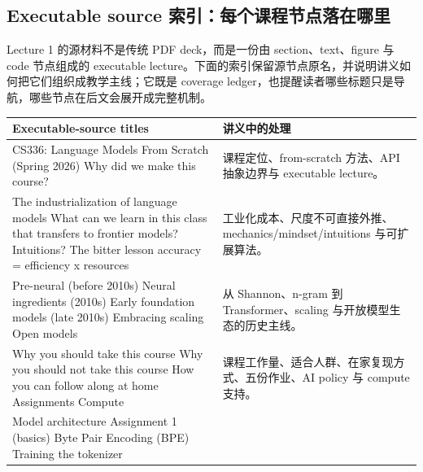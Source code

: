 \documentclass[a4paper]{article}
\begin{document}
\subsection{Executable source 索引：每个课程节点落在哪里}

Lecture 1 的源材料不是传统 PDF deck，而是一份由 section、text、figure 与 code 节点组成的 executable lecture。下面的索引保留源节点原名，并说明讲义如何把它们组织成教学主线；它既是 coverage ledger，也提醒读者哪些标题只是导航，哪些节点在后文会展开成完整机制。

\begin{longtable}{p{}p{}}
\toprule
\textbf{Executable-source titles} & \textbf{讲义中的处理} \\
\midrule
CS336: Language Models From Scratch (Spring 2026)\newline
Why did we make this course? & 课程定位、from-scratch 方法、API 抽象边界与 executable lecture。 \\
The industrialization of language models\newline
What can we learn in this class that transfers to frontier models?\newline
Intuitions?\newline
The bitter lesson\newline
accuracy = efficiency x resources & 工业化成本、尺度不可直接外推、mechanics/mindset/intuitions 与可扩展算法。 \\
Pre-neural (before 2010s)\newline
Neural ingredients (2010s)\newline
Early foundation models (late 2010s)\newline
Embracing scaling\newline
Open models & 从 Shannon、n-gram 到 Transformer、scaling 与开放模型生态的历史主线。 \\
Why you should take this course\newline
Why you should not take this course\newline
How you can follow along at home\newline
Assignments\newline
Compute & 课程工作量、适合人群、在家复现方式、五份作业、AI policy 与 compute 支持。 \\
Model architecture\newline
Assignment 1 (basics)\newline
Byte Pair Encoding (BPE)\newline
Training the tokenizer\newline

\end{longtable}
\end{document}

